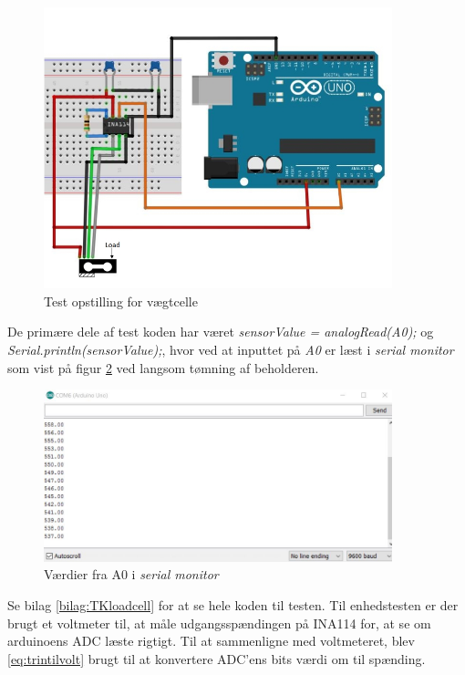   \begin{figure}[H]
	\centering
	\includegraphics[width=0.9\textwidth]{billeder/Hardware/diagrammer/Drawing1.jpg}
	\caption{Test opstilling for vægtcelle}
	\label{fig:loadcelltest}
\end{figure}
De primære dele af test koden har været  \textit{sensorValue = analogRead(A0);} og \textit{Serial.println(sensorValue);}, hvor ved at inputtet på \textit{A0} er læst i \textit{serial monitor} som vist på figur \ref{fig:loadcell_test} ved langsom tømning af beholderen.

\begin{figure}[H]
	\centering
	\includegraphics[width=0.9\textwidth]{billeder/Hardware/diagrammer/loadcellunittestbits.JPG}
	\caption{Værdier fra A0 i \textit{serial monitor}}
	\label{fig:loadcell_test}
\end{figure}

 Se bilag \ref{bilag:TKloadcell} for at se hele koden til testen. Til enhedstesten er der brugt et voltmeter til, at måle udgangsspændingen på INA114 for, at se om arduinoens ADC læste rigtigt. Til at sammenligne med voltmeteret, blev \ref{eq:trintilvolt} brugt til at konvertere ADC'ens bits værdi om til spænding.
 
